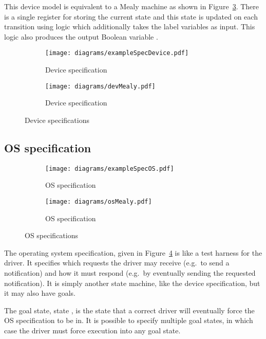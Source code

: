 This device model is equivalent to a Mealy machine as shown in Figure~\ref{fig:dev_spec_mealy}. There is a single register for storing the current state and this state is updated on each transition using logic which additionally takes the label variables as input. This logic also produces the output Boolean variable .

\begin{figure}
\centering
\begin{subfigure}[t]{0.47\textwidth}
\texttt{[image: diagrams/exampleSpecDevice.pdf]}
\caption{Device specification}
\label{fig:dev_spec}
\end{subfigure}
\hfill
\begin{subfigure}[t]{0.47\textwidth}
\texttt{[image: diagrams/devMealy.pdf]}
\caption{Device specification}
\label{fig:dev_spec_mealy}
\end{subfigure}
\caption{Device specifications}
\end{figure}

\subsection{OS specification}

\begin{figure}
\centering
\begin{subfigure}[t]{0.47\textwidth}
\texttt{[image: diagrams/exampleSpecOS.pdf]}
\caption{OS specification}
\label{fig:os_spec}
\end{subfigure}
\hfill
\begin{subfigure}[t]{0.47\textwidth}
\centering
\texttt{[image: diagrams/osMealy.pdf]}
\caption{OS specification}
\label{fig:os_spec_mealy}
\end{subfigure}
\caption{OS specifications}
\end{figure}

The operating system specification, given in Figure~\ref{fig:os_spec} is like a test harness for the driver. It specifies which requests the driver may receive (e.g.\ to send a notification) and how it must respond (e.g.\ by eventually sending the requested notification). It is simply another state machine, like the device specification, but it may also have goals.

The goal state, state , is the state that a correct driver will eventually force the OS specification to be in. It is possible to specify multiple goal states, in which case the driver must force execution into any goal state.

